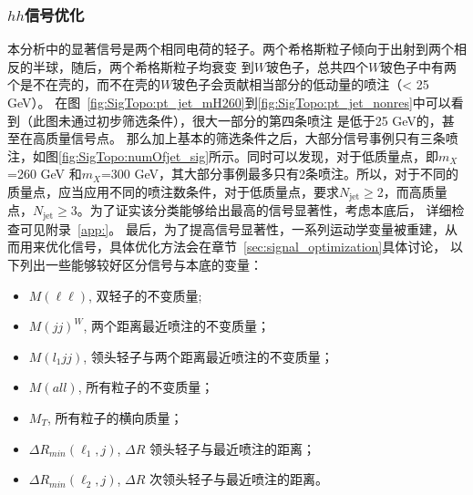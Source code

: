 \subsubsection{$hh$信号优化}\label{subsubsec:hh_optimization}
本分析中的显著信号是两个相同电荷的轻子。两个希格斯粒子倾向于出射到两个相反的半球，随后，两个希格斯粒子均衰变
到$W$玻色子，总共四个$W$玻色子中有两个是不在壳的，而不在壳的$W$玻色子会贡献相当部分的低动量的喷注（\pt < 25 GeV）。
在图~\ref{fig:SigTopo:pt_jet_mH260}到\ref{fig:SigTopo:pt_jet_nonres}中可以看到（此图未通过初步筛选条件），很大一部分的第四条喷注 \pt 是低于25 GeV的，甚至在高质量信号点。
那么加上基本的筛选条件之后，大部分信号事例只有三条喷注，如图\ref{fig:SigTopo:numOfjet_sig}所示。同时可以发现，对于低质量点，即$m_X$=260 GeV 和$m_X$=300 GeV，其大部分事例最多只有2条喷注。所以，对于不同的质量点，应当应用不同的喷注数条件，对于低质量点，要求$N_\text{jet}\ge$2，而高质量点，$N_\text{jet}\ge$3。为了证实该分类能够给出最高的信号显著性，考虑本底后，
详细检查可见附录~\ref{app:}。
最后，为了提高信号显著性，一系列运动学变量被重建，从而用来优化信号，具体优化方法会在章节~\ref{sec:signal_optimization}具体讨论，
以下列出一些能够较好区分信号与本底的变量：
\begin{itemize}
 \item $M(\ell\ell)$, 双轻子的不变质量;
 \item $M(jj)^W$, 两个距离最近喷注的不变质量；%
 \item $M(l_1jj)$, 领头轻子与两个距离最近喷注的不变质量；%
 \item $M(all)$, 所有粒子的不变质量；%
 \item $M_T$, 所有粒子的横向质量；%
 \item $\Delta R_{min}(\ell_1, j)$, $\Delta R$ 领头轻子与最近喷注的距离；%
 \item $\Delta R_{min}(\ell_2, j)$, $\Delta R$ 次领头轻子与最近喷注的距离。%
\end{itemize}


